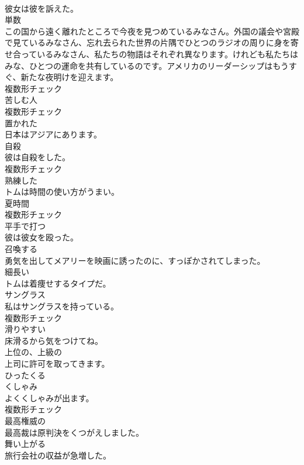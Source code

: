 \documentclass[8pt]{extreport}
\begin{document}
\begin{CJK}{UTF8}{min}
\\	彼女は彼を訴えた。	
\\	[名詞]	単数	
\\	この国から遠く離れたところで今夜を見つめているみなさん。外国の議会や宮殿で見ているみなさん、忘れ去られた世界の片隅でひとつのラジオの周りに身を寄せ合っているみなさん、私たちの物語はそれぞれ異なります。けれども私たちはみな、ひとつの運命を共有しているのです。アメリカのリーダーシップはもうすぐ、新たな夜明けを迎えます。	
\\	複数形チェック
\\	[名詞]	苦しむ人	
\\	複数形チェック
\\	[形容詞]	置かれた	
\\	日本はアジアにあります。	
\\	[名詞]	自殺	
\\	彼は自殺をした。	
\\	複数形チェック
\\	[形容詞]	熟練した	
\\	トムは時間の使い方がうまい。	
\\	[名詞]	夏時間	
\\	複数形チェック
\\	[動詞]	平手で打つ	
\\	彼は彼女を殴った。	
\\	[動詞]	召喚する	
\\	勇気を出してメアリーを映画に誘ったのに、すっぽかされてしまった。	
\\	[形容詞]	細⻑い	
\\	トムは着痩せするタイプだ。	
\\	[名詞]	サングラス	
\\	私はサングラスを持っている。	
\\	複数形チェック
\\	[形容詞]	滑りやすい	
\\	床滑るから気をつけてね。	
\\	[形容詞]	上位の、上級の	
\\	上司に許可を取ってきます。	
\\	[動詞]	ひったくる	
\\	[名詞]	くしゃみ	
\\	よくくしゃみが出ます。	
\\	複数形チェック
\\	[形容詞]	最高権威の	
\\	最高裁は原判決をくつがえしました。	
\\	[動詞]	舞い上がる	
\\	旅行会社の収益が急増した。	

\end{CJK}
\end{document}
